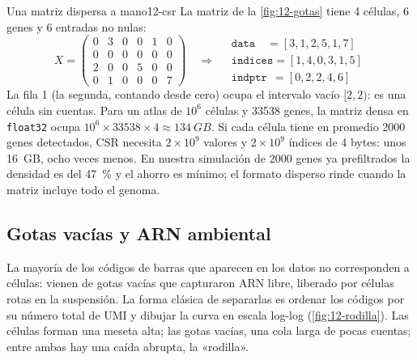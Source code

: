 \begin{ejemplo}{Una matriz dispersa a mano}{12-csr}
La matriz de la \cref{fig:12-gotas} tiene 4 células, 6 genes y 6 entradas no nulas:
\[
X=\begin{pmatrix}0&3&0&0&1&0\\0&0&0&0&0&0\\2&0&0&5&0&0\\0&1&0&0&0&7\end{pmatrix}
\quad\Longrightarrow\quad
\begin{array}{l}
\texttt{data}\;\;\;\,= [3, 1, 2, 5, 1, 7]\\
\texttt{indices} = [1, 4, 0, 3, 1, 5]\\
\texttt{indptr}\;\, = [0, 2, 2, 4, 6]
\end{array}
\]
La fila 1 (la segunda, contando desde cero) ocupa el intervalo vacío $[2,2)$: es una célula sin cuentas. Para un atlas de $10^6$ células y \num{33538} genes, la matriz densa en \texttt{float32} ocupa $10^6\times\num{33538}\times 4\approx\SI{134}{GB}$. Si cada célula tiene en promedio \num{2000} genes detectados, CSR necesita $2\times10^9$ valores y $2\times10^9$ índices de 4 bytes: unos \SI{16}{GB}, ocho veces menos. En nuestra simulación de \num{2000} genes ya prefiltrados la densidad es del \SI{47}{\percent} y el ahorro es mínimo; el formato disperso rinde cuando la matriz incluye todo el genoma.
\end{ejemplo}

\subsection{Gotas vacías y ARN ambiental}

La mayoría de los códigos de barras que aparecen en los datos no corresponden a células: vienen de gotas vacías que capturaron ARN libre, liberado por células rotas en la suspensión. La forma clásica de separarlas es ordenar los códigos por su número total de UMI y dibujar la curva en escala log-log (\cref{fig:12-rodilla}). Las células forman una meseta alta; las gotas vacías, una cola larga de pocas cuentas; entre ambas hay una caída abrupta, la «rodilla».

